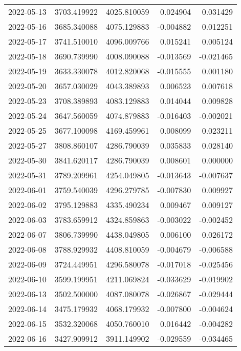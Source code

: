 \begin{tabular}{lrrrr}
2022-05-13 & 3703.419922 & 4025.810059 &        0.024904 &     0.031429 \\
2022-05-16 & 3685.340088 & 4075.129883 &       -0.004882 &     0.012251 \\
2022-05-17 & 3741.510010 & 4096.009766 &        0.015241 &     0.005124 \\
2022-05-18 & 3690.739990 & 4008.090088 &       -0.013569 &    -0.021465 \\
2022-05-19 & 3633.330078 & 4012.820068 &       -0.015555 &     0.001180 \\
2022-05-20 & 3657.030029 & 4043.389893 &        0.006523 &     0.007618 \\
2022-05-23 & 3708.389893 & 4083.129883 &        0.014044 &     0.009828 \\
2022-05-24 & 3647.560059 & 4074.879883 &       -0.016403 &    -0.002021 \\
2022-05-25 & 3677.100098 & 4169.459961 &        0.008099 &     0.023211 \\
2022-05-27 & 3808.860107 & 4286.790039 &        0.035833 &     0.028140 \\
2022-05-30 & 3841.620117 & 4286.790039 &        0.008601 &     0.000000 \\
2022-05-31 & 3789.209961 & 4254.049805 &       -0.013643 &    -0.007637 \\
2022-06-01 & 3759.540039 & 4296.279785 &       -0.007830 &     0.009927 \\
2022-06-02 & 3795.129883 & 4335.490234 &        0.009467 &     0.009127 \\
2022-06-03 & 3783.659912 & 4324.859863 &       -0.003022 &    -0.002452 \\
2022-06-07 & 3806.739990 & 4438.049805 &        0.006100 &     0.026172 \\
2022-06-08 & 3788.929932 & 4408.810059 &       -0.004679 &    -0.006588 \\
2022-06-09 & 3724.449951 & 4296.580078 &       -0.017018 &    -0.025456 \\
2022-06-10 & 3599.199951 & 4211.069824 &       -0.033629 &    -0.019902 \\
2022-06-13 & 3502.500000 & 4087.080078 &       -0.026867 &    -0.029444 \\
2022-06-14 & 3475.179932 & 4068.179932 &       -0.007800 &    -0.004624 \\
2022-06-15 & 3532.320068 & 4050.760010 &        0.016442 &    -0.004282 \\
2022-06-16 & 3427.909912 & 3911.149902 &       -0.029559 &    -0.034465 \\

\end{tabular}
